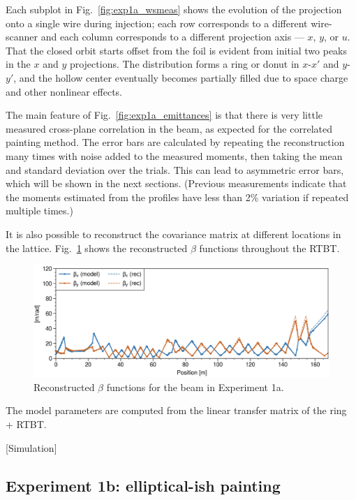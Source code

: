 %
Each subplot in Fig.~\ref{fig:exp1a_wsmeas} shows the evolution of the projection onto a single wire during injection; each row corresponds to a different wire-scanner and each column corresponds to a different projection axis — $x$, $y$, or $u$. That the closed orbit starts offset from the foil is evident from initial two peaks in the $x$ and $y$ projections. The distribution forms a ring or donut in $x$-$x'$ and $y$-$y'$, and the hollow center eventually becomes partially filled due to space charge and other nonlinear effects.

The main feature of Fig.~\ref{fig:exp1a_emittances} is that there is very little measured cross-plane correlation in the beam, as expected for the correlated painting method. The error bars are calculated by repeating the reconstruction many times with noise added to the measured moments, then taking the mean and standard deviation over the trials. This can lead to asymmetric error bars, which will be shown in the next sections. (Previous measurements indicate that the moments estimated from the profiles have less than 2\% variation if repeated multiple times.)

It is also possible to reconstruct the covariance matrix at different locations in the lattice. Fig.~\ref{fig:exp1a_rec_betas_throughout} shows the reconstructed $\beta$ functions throughout the RTBT.
%
\begin{figure}[!p]
    \centering
    \includegraphics[width=1.0\textwidth]{Images/chapter5/exp1a/rec_betas_throughout.png}
    \caption{Reconstructed $\beta$ functions for the beam in Experiment 1a.}
    \label{fig:exp1a_rec_betas_throughout}
\end{figure}
%
The model parameters are computed from the linear transfer matrix of the ring + RTBT. 


[Simulation]





\subsection{Experiment 1b: elliptical-ish painting}

